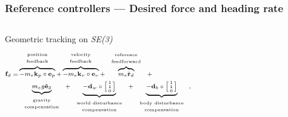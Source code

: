 \documentclass[aspectratio=169]{beamer}
\begin{document}
\begin{frame}
\frametitle{Reference controllers --- Desired force and heading rate}

\begin{columns}[c]


\begin{block}{\small Geometric tracking on \emph{SE(3)} \cite{lee2010geometric}}
  \begin{equation}
    \scriptsize
    \begin{split}
      \mathbf{f}_d = &\overbrace{-m_e\mathbf{k}_p\circ \mathbf{e}_p}^{\begin{tabular}{c}
        \tiny position\\
        \tiny feedback
      \end{tabular}} + \overbrace{-m_e\mathbf{k}_v\circ \mathbf{e}_v}^{\begin{tabular}{c}
        \tiny velocity\\
        \tiny feedback
      \end{tabular}} + \overbrace{m_e\ddot{\mathbf{r}}_d}^{\begin{tabular}{c}
        \tiny reference\\
        \tiny feedforward
      \end{tabular}} + \\
      & \underbrace{m_eg\mathbf{\hat{e}}_3}_{\begin{tabular}{c}
        \tiny gravity\\
        \tiny compensation
      \end{tabular}} + \underbrace{-\mathbf{d}_w\circ \left[\begin{smallmatrix}
        1\\
        1\\
        0
      \end{smallmatrix}\right]}_{\begin{tabular}{c}
        \tiny world disturbance\\
        \tiny compensation
      \end{tabular}} + \underbrace{-\mathbf{d}_b\circ \left[\begin{smallmatrix}
        1\\
        1\\
        0
      \end{smallmatrix}\right]}_{\begin{tabular}{c}
        \tiny body disturbance\\
        \tiny compensation
      \end{tabular}},
    \end{split}
  \end{equation}
\end{block}


\end{columns}
\end{frame}
\end{document}

